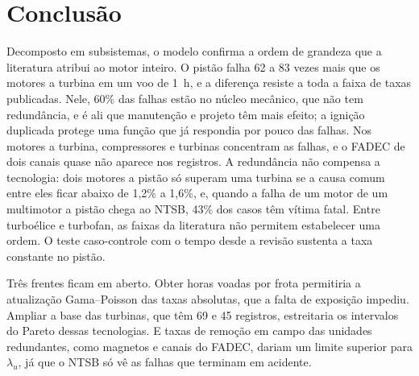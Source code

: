 \section{Conclusão}\label{sec:conclusao}

Decomposto em subsistemas, o modelo confirma a ordem de grandeza que a literatura atribui ao motor inteiro.
O pistão falha 62 a 83 vezes mais que os motores a turbina em um voo de 1~h, e a diferença resiste a toda a faixa de taxas publicadas.
Nele, 60\% das falhas estão no núcleo mecânico, que não tem redundância, e é ali que manutenção e projeto têm mais efeito; a ignição duplicada protege uma função que já respondia por pouco das falhas.
Nos motores a turbina, compressores e turbinas concentram as falhas, e o FADEC de dois canais quase não aparece nos registros.
A redundância não compensa a tecnologia: dois motores a pistão só superam uma turbina se a causa comum entre eles ficar abaixo de 1,2\% a 1,6\%, e, quando a falha de um motor de um multimotor a pistão chega ao NTSB, 43\% dos casos têm vítima fatal.
Entre turboélice e turbofan, as faixas da literatura não permitem estabelecer uma ordem.
O teste caso-controle com o tempo desde a revisão sustenta a taxa constante no pistão.

Três frentes ficam em aberto.
Obter horas voadas por frota permitiria a atualização Gama--Poisson das taxas absolutas, que a falta de exposição impediu.
Ampliar a base das turbinas, que têm 69 e 45 registros, estreitaria os intervalos do Pareto dessas tecnologias.
E taxas de remoção em campo das unidades redundantes, como magnetos e canais do FADEC, dariam um limite superior para $\lambda_u$, já que o NTSB só vê as falhas que terminam em acidente.
